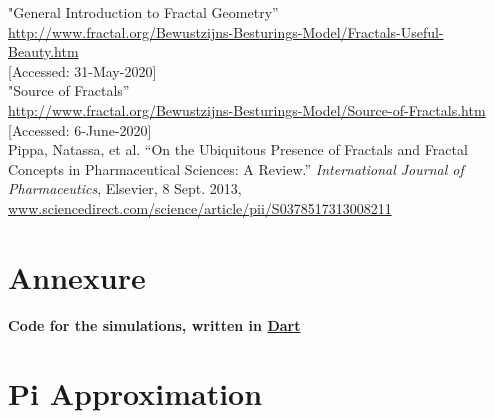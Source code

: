 \documentclass{resonance}
\begin{document}
\begin{thebibliography}{99}
"General Introduction to Fractal Geometry”\\ \textcolor{blue}{\url{http://www.fractal.org/Bewustzijns-Besturings-Model/Fractals-Useful-Beauty.htm}}\\
{[Accessed: 31-May-2020]}\\

"Source of Fractals”\\ \textcolor{blue}{\url{http://www.fractal.org/Bewustzijns-Besturings-Model/Source-of-Fractals.htm}}\\
{[Accessed: 6-June-2020]}\\

Pippa, Natassa, et al. “On the Ubiquitous Presence of Fractals and Fractal Concepts in Pharmaceutical Sciences: A Review.” \textit{International Journal of Pharmaceutics}, Elsevier, 8 Sept. 2013,\\
\textcolor{blue}{\url{www.sciencedirect.com/science/article/pii/S0378517313008211}}

\end{thebibliography}

\pagebreak

\setlength{\leftskip}{0cm}
\section*{Annexure}

\textbf{Code for the simulations, written in \textcolor{blue}{\href{https://github.com/dart-lang/sdk}{Dart}}}

\setcounter{section}{0}
\section{Pi Approximation}
\end{document}

